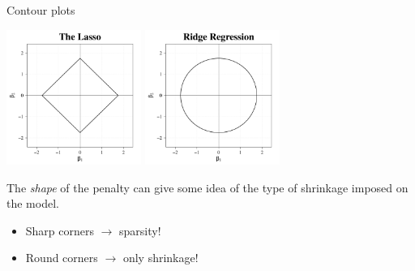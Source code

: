 \documentclass[8pt]{beamer}
\begin{document}
\begin{frame}[noframenumbering]{\color{white} Contour plots}

\begin{center}
    \centering
    \includegraphics[width = 0.33\textwidth]{cont_lasso.pdf}
    \includegraphics[width = 0.33\textwidth]{cont_ridge.pdf}
\end{center}
The \textit{shape} of the penalty can give some idea of the type of shrinkage imposed on the model.
\begin{itemize}
    \item Sharp corners $\to$ sparsity! \Laughey[1.5][yellow][pink]
    \item Round corners $\to$ only shrinkage!
\end{itemize}
    
\end{frame}
\end{document}
